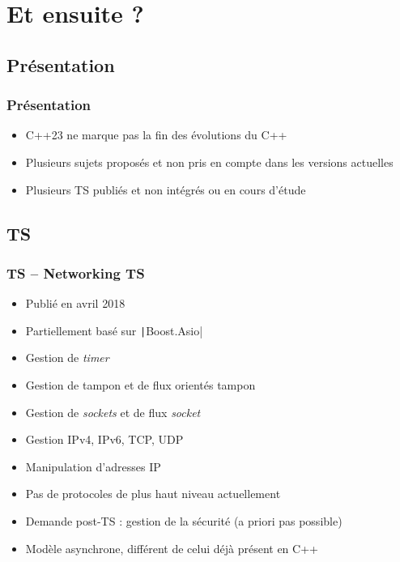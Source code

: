 \documentclass[C++.tex]{subfiles}
\begin{document}
\section{Et ensuite ?}
\subsection*{Présentation}
\begin{frame}[fragile]
	\frametitle{Présentation}
	\begin{itemize}
		\item C++23 ne marque pas la fin des évolutions du C++
		\item Plusieurs sujets proposés et non pris en compte dans les versions actuelles
		\item Plusieurs TS publiés et non intégrés ou en cours d'étude
	\end{itemize}
\end{frame}

\subsection*{TS}
\begin{frame}[fragile]
	\frametitle{TS -- Networking TS}
	\begin{itemize}
		\item Publié en avril 2018
		\item Partiellement basé sur \texttt|Boost.Asio|
		\item Gestion de \textit{timer}
		\item Gestion de tampon et de flux orientés tampon
		\item Gestion de \textit{sockets} et de flux \textit{socket}
		\item Gestion IPv4, IPv6, TCP, UDP
		\item Manipulation d'adresses IP
		\item Pas de protocoles de plus haut niveau actuellement
		\item Demande post-TS : gestion de la sécurité (a priori pas possible)
		\item Modèle asynchrone, différent de celui déjà présent en C++
	\end{itemize}

\end{frame}
\end{document}
